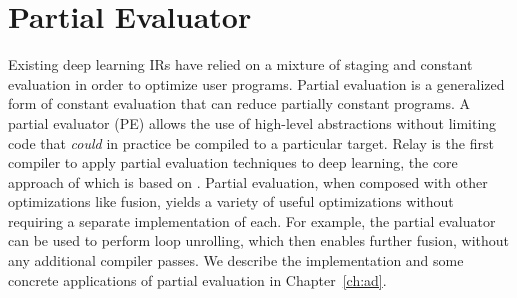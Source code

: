 
\section{Partial Evaluator}
\label{sec:partial_eval}
Existing deep learning IRs have relied on
  a mixture of staging and constant evaluation
  in order to optimize user programs.
Partial evaluation is a generalized form of constant
  evaluation that can reduce partially constant
  programs.
A partial evaluator (PE) allows the use of high-level abstractions
  without limiting code that \textit{could} in practice be
  compiled to a particular target.
Relay is the first compiler to apply partial evaluation
  techniques to deep learning, the
  core approach of which is based on \citep{pe_ref}.
Partial evaluation, when composed with other
  optimizations like fusion, yields a variety
  of useful optimizations without requiring
  a separate implementation of each.
For example, the partial evaluator can be used to perform
  loop unrolling, which then enables further fusion,
  without any additional compiler passes.
We describe the implementation and some
  concrete applications of partial evaluation
  in Chapter~\ref{ch:ad}.

